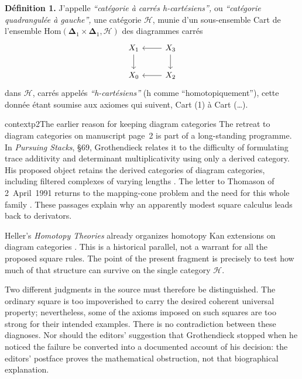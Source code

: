 \noindent\textbf{Définition 1.} J'appelle \textit{“catégorie à carrés h-cartésiens”,} ou \textit{“catégorie quadrangulée à gauche”,} une catégorie $\mathcal{H}$, munie d'un sous-ensemble Cart de l'ensemble $\mathrm{Hom}(\boldsymbol{\Delta}_1\times\boldsymbol{\Delta}_1,\mathcal{H})$
des diagrammes carrés
\[
\begin{tikzcd}
X_1 \arrow[d] & X_3 \arrow[l] \arrow[d] \\
X_0 & X_2 \arrow[l]
\end{tikzcd}
\]
dans $\mathcal{H}$, carrés appelés \textit{“h-cartésiens”} (h comme “homotopiquement”), cette  donnée étant soumise aux axiomes qui suivent, Cart (1) à Cart (\ldots).

\begin{dcomment}{context}{p2}{The earlier reason for keeping diagram categories}
The retreat to diagram categories on manuscript page~2 is part of a long-standing programme. In \emph{Pursuing Stacks}, \S69, Grothendieck relates it to the difficulty of formulating trace additivity and determinant multiplicativity using only a derived category. His proposed object retains the derived categories of diagram categories, including filtered complexes of varying lengths \citep[pp.~1--2 of the edited excerpt]{Grothendieck1983}. The letter to Thomason of 2~April~1991 returns to the mapping-cone problem and the need for this whole family \citep[\S2, pp.~5--6]{Grothendieck1991Letter}. These passages explain why an apparently modest square calculus leads back to derivators.

Heller's \emph{Homotopy Theories} already organizes homotopy Kan extensions on diagram categories \citep[Introduction, pp.~1--2]{Heller1988}. This is a historical parallel, not a warrant for all the proposed square rules. The point of the present fragment is precisely to test how much of that structure can survive on the single category $\mathcal H$.

Two different judgments in the source must therefore be distinguished. The ordinary square is too impoverished to carry the desired coherent universal property; nevertheless, some of the axioms imposed on such squares are too strong for their intended examples. There is no contradiction between these diagnoses. Nor should the editors' suggestion that Grothendieck stopped when he noticed the failure be converted into a documented account of his decision: the editors' postface proves the mathematical obstruction, not that biographical explanation.
\end{dcomment}


